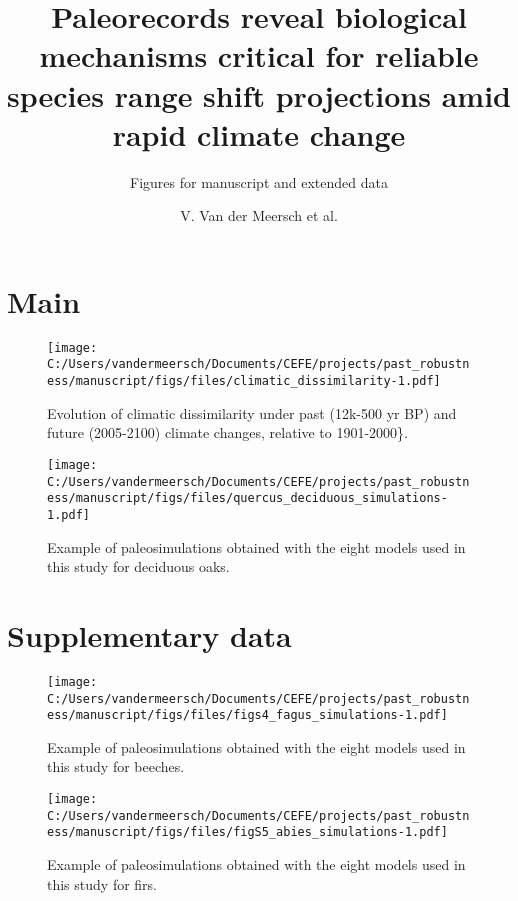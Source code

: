 \documentclass[
]{article}
\title{Paleorecords reveal biological mechanisms critical for reliable
species range shift projections amid rapid climate change}
\subtitle{Figures for manuscript and extended data}
\author{V. Van der Meersch et al.}
\date{}
\begin{document}
\maketitle

\hypertarget{main}{%
\section{Main}\label{main}}

\begin{figure}
\centering
\texttt{[image: C:/Users/vandermeersch/Documents/CEFE/projects/past\_robustness/manuscript/figs/files/climatic\_dissimilarity-1.pdf]}
\caption{Evolution of climatic dissimilarity under past (12k-500 yr BP)
and future (2005-2100) climate changes, relative to 1901-2000\}.}
\end{figure}

\newpage

\begin{figure}
\centering
\texttt{[image: C:/Users/vandermeersch/Documents/CEFE/projects/past\_robustness/manuscript/figs/files/quercus\_deciduous\_simulations-1.pdf]}
\caption{Example of paleosimulations obtained with the eight models used
in this study for deciduous oaks.}
\end{figure}

\newpage

\newpage

\hypertarget{supplementary-data}{%
\section{Supplementary data}\label{supplementary-data}}

\renewcommand{\thefigure}{S\arabic{figure}}
\setcounter{figure}{0}

\begin{figure}
\centering
\texttt{[image: C:/Users/vandermeersch/Documents/CEFE/projects/past\_robustness/manuscript/figs/files/figs4\_fagus\_simulations-1.pdf]}
\caption{Example of paleosimulations obtained with the eight models used
in this study for beeches.}
\end{figure}

\begin{figure}
\centering
\texttt{[image: C:/Users/vandermeersch/Documents/CEFE/projects/past\_robustness/manuscript/figs/files/figS5\_abies\_simulations-1.pdf]}
\caption{Example of paleosimulations obtained with the eight models used
in this study for firs.}
\end{figure}
\end{document}
